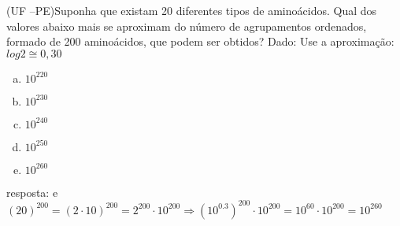 \begin{ex}
(UF –PE)Suponha que existam 20 diferentes tipos de aminoácidos. Qual dos valores abaixo mais se aproximam do número de agrupamentos ordenados, formado de 200 aminoácidos, que podem ser obtidos? Dado: Use a aproximação: $log 2 \cong 0,30$  
   \begin{enumerate}[(a)]
   \item ${10}^{220}$
   \item ${10}^{230}$
   \item ${10}^{240}$
   \item ${10}^{250}$
   \item ${10}^{260}$
   \end{enumerate}
     \begin{sol}
      resposta: e \\
      $(20)^{200}=(2\cdot10)^{200}=2^{200}\cdot10^{200} \Longrightarrow (10^{0.3})^{200}\cdot10^{200}=10^{60}\cdot10^{200}=10^{260}$
     \end{sol}
\end{ex}